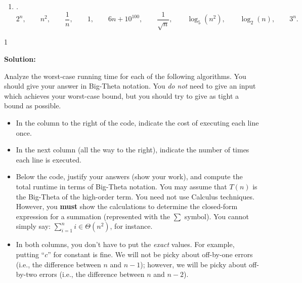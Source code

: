 \documentclass[9pt]{article}
\def\solutions{1}
\begin{document}
\begin{enumerate}
\item \label{2a} {\itshape.
\[
2^n, \qquad 
n^2, \qquad
\frac{1}{n}, \qquad
1, \qquad
6n+10^{100}, \qquad
\frac{1}{\sqrt{n}}, \qquad
\log_5(n^2), \qquad
\log_2(n), \qquad
3^n.
\]
}

\end{enumerate}

\if\solutions1
\vspace{2mm}

\textbf{Solution:} \\


\fi
\newpage



\vspace{5mm}

\item 
Analyze the worst-case running time for each of the following algorithms. You should give your answer in Big-Theta notation. You \emph{do not} need to give an input which achieves your worst-case bound, but you should try to give as tight a bound as possible. 
	\begin{itemize}
	\item In the column to the right of the code, indicate the cost of executing each line once.
	
	\item In the next column (all the way to the right), indicate the number of times each line is executed.
	
	\item Below the code, justify your answers (show your work), and compute the total runtime in terms of Big-Theta notation.  You may assume that $T(n)$ is the Big-Theta of the high-order term. You need not use Calculus techniques. However, you \textbf{must} show the calculations to determine the closed-form expression for a summation (represented with the $\displaystyle \sum$ symbol). You cannot simply say: $\displaystyle \sum_{i=1}^{n} i \in \Theta(n^{2})$, for instance.
	
	\item In both columns, you don't have to put the \emph{exact} values. For example, putting ``$c$'' for constant is fine. We will not be picky about off-by-one errors (i.e., the difference between $n$ and $n-1$); however, we will be picky about off-by-two errors (i.e., the difference between $n$ and $n-2$).
    \end{itemize}
\end{document}
